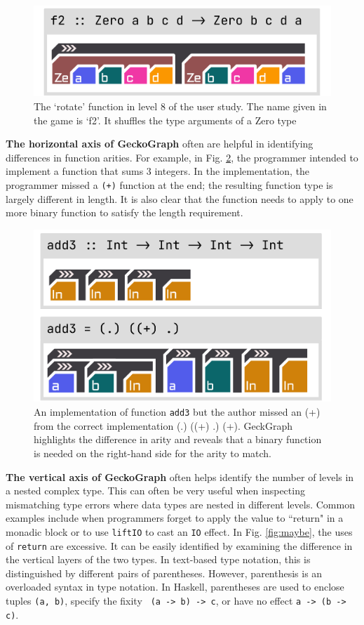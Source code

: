 \documentclass[preprint,12pt]{elsarticle}
\begin{document}
\begin{figure}[]
  \includegraphics[width=0.6\linewidth]{figures/rotate}
  \caption{\label{fig:rotate} The `rotate' function in level 8 of the user study. The name given in the game is `f2'. It shuffles the type arguments of a Zero type}
\end{figure}


\textbf{The horizontal axis of GeckoGraph} often are helpful in identifying differences in function arities. For example, in Fig. \ref{fig:add3}, the programmer intended to implement a function that sums 3 integers. In the implementation, the programmer missed a \texttt{(+)} function at the end; the resulting function type is largely different in length. It is also clear that the function needs to apply to one more binary function to satisfy the length requirement.  

\begin{figure}[]
  \includegraphics[width=0.6\linewidth]{figures/Add3}
  \caption{\label{fig:add3} An implementation of function \texttt{add3} but the author missed an (+) from the correct implementation (.) ((+) .) (+). GeckGraph highlights the difference in arity and reveals that a binary function is needed on the right-hand side for the arity to match. }
\end{figure}

\textbf{The vertical axis of GeckoGraph} often helps identify the number of levels in a nested complex type. This can often be very useful when inspecting mismatching type errors where data types are nested in different levels. Common examples include when programmers forget to apply the value to ``return" in a monadic block or to use \texttt{liftIO} to cast an \texttt{IO} effect. In Fig. \ref{fig:maybe}, the uses of \texttt{return} are excessive. It can be easily identified by examining the difference in the vertical layers of the two types. In text-based type notation, this is distinguished by different pairs of parentheses. However, parenthesis is an overloaded syntax in type notation. In Haskell, parentheses are used to enclose tuples \texttt{(a, b)}, specify the fixity \texttt{ (a -> b) -> c}, or have no effect \texttt{a -> (b -> c)}.
\end{document}
